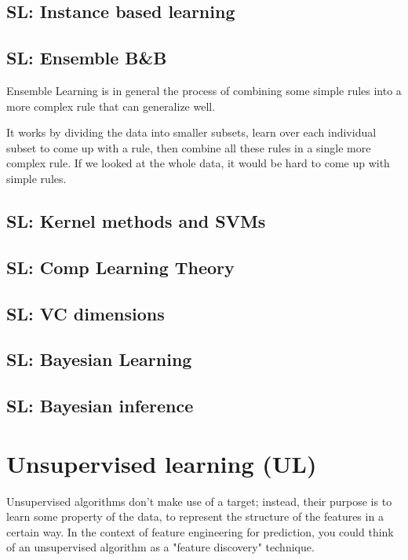 \documentclass[12pt]{report}
\begin{document}
\section{SL: Instance based learning}
\section{SL: Ensemble B\&B}

Ensemble Learning is in general the process of combining some simple rules into a more complex rule that can generalize well.

It works by dividing the data into smaller subsets, learn over each individual subset to come up with a rule, then combine all these rules in a single more complex rule. If we looked at the whole data, it would be hard to come up with simple rules.




\section{SL: Kernel methods and SVMs}
\section{SL: Comp Learning Theory}
\section{SL: VC dimensions}
\section{SL: Bayesian Learning}
\section{SL: Bayesian inference}


\chapter[Unsupervised learning]{Unsupervised learning (UL)}

Unsupervised algorithms don't make use of a target; instead, their purpose is to learn some property of the data, to represent the structure of the features in a certain way. In the context of feature engineering for prediction, you could think of an unsupervised algorithm as a "feature discovery" technique.
\end{document}

